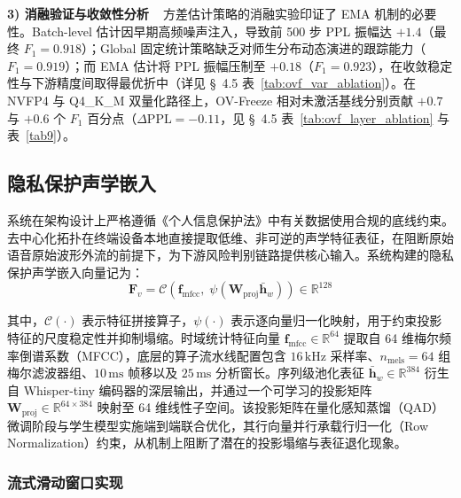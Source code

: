 \documentclass[11pt, a4paper]{article}
\begin{document}
\textbf{3) 消融验证与收敛性分析}
~ 方差估计策略的消融实验印证了 EMA 机制的必要性。Batch-level 估计因早期高频噪声注入，导致前 500 步 PPL 振幅达 $+1.4$（最终 $F_1=0.918$）；Global 固定统计策略缺乏对师生分布动态演进的跟踪能力（$F_1=0.919$）；而 EMA 估计将 PPL 振幅压制至 $+0.18$（$F_1=0.923$），在收敛稳定性与下游精度间取得最优折中（详见 \S~4.5 表~\ref{tab:ovf_var_ablation}）。在 NVFP4 与 Q4\_K\_M 双量化路径上，OV-Freeze 相对未激活基线分别贡献 $+0.7$ 与 $+0.6$ 个 $F_1$ 百分点（$\Delta\text{PPL}=-0.11$，见 \S~4.5 表~\ref{tab:ovf_layer_ablation} 与表~\ref{tab9}）。


\subsection{隐私保护声学嵌入}

系统在架构设计上严格遵循《个人信息保护法》中有关数据使用合规的底线约束。去中心化拓扑在终端设备本地直接提取低维、非可逆的声学特征表征，在阻断原始语音原始波形外流的前提下，为下游风险判别链路提供核心输入。系统构建的隐私保护声学嵌入向量记为： 
\begin{equation}
\label{eq:Fv_main}
    \bm{F}_v
    =
    \mathcal{C}\!\left(
        \bm{f}_{\mathrm{mfcc}},
        \;
        \psi\!\left(
            \bm{W}_{\mathrm{proj}}
            \bar{\bm{h}}_{w}
        \right)
    \right)
    \in \mathbb{R}^{128}
\end{equation}

其中，$\mathcal{C}(\cdot)$ 表示特征拼接算子，$\psi(\cdot)$ 表示逐向量归一化映射，用于约束投影特征的尺度稳定性并抑制塌缩。时域统计特征向量 $\bm{f}_{\mathrm{mfcc}}\in\mathbb{R}^{64}$ 提取自 64 维梅尔频率倒谱系数（MFCC），底层的算子流水线配置包含 $16\,\mathrm{kHz}$ 采样率、$n_{\mathrm{mels}}=64$ 组梅尔滤波器组、$10\,\mathrm{ms}$ 帧移以及 $25\,\mathrm{ms}$ 分析窗长。序列级池化表征 $\bar{\bm{h}}_{w}\in\mathbb{R}^{384}$ 衍生自 Whisper-tiny 编码器的深层输出，并通过一个可学习的投影矩阵 $\bm{W}_{\mathrm{proj}}\in\mathbb{R}^{64\times384}$ 映射至 64 维线性子空间。该投影矩阵在量化感知蒸馏（QAD）微调阶段与学生模型实施端到端联合优化，其行向量并行承载行归一化（Row Normalization）约束，从机制上阻断了潜在的投影塌缩与表征退化现象。

\subsubsection{流式滑动窗口实现}
\end{document}
